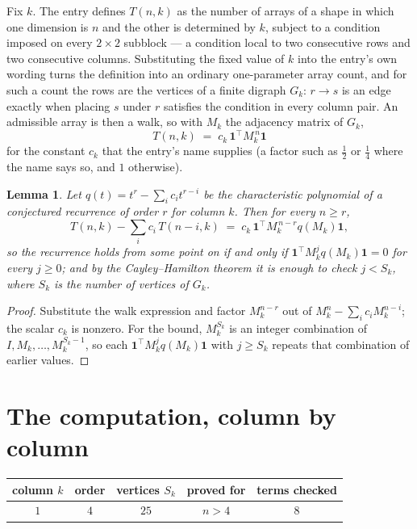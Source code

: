 \documentclass[11pt,a4paper]{article}
\theoremstyle{plain}
\newtheorem{lemma}[theorem]{Lemma}
\theoremstyle{definition}
\begin{document}
Fix $k$. The entry defines $T(n,k)$ as the number of arrays of a shape in which one dimension
is $n$ and the other is determined by $k$, subject to a condition imposed on every
$2\times2$ subblock --- a condition local to two consecutive rows and two consecutive columns.
Substituting the fixed value of $k$ into the entry's own wording turns the definition into an
ordinary one-parameter array count, and for such a count the rows are the vertices of a finite
digraph $G_k$: $r\to s$ is an edge exactly when placing $s$ under $r$ satisfies the condition
in every column pair. An admissible array is then a walk, so with $M_k$ the adjacency matrix
of $G_k$,
\[
T(n,k)\;=\;c_k\,\mathbf{1}^{\!\top}M_k^{\,n}\mathbf{1}
\]
for the constant $c_k$ that the entry's name supplies (a factor such as $\tfrac12$ or
$\tfrac14$ where the name says so, and $1$ otherwise).

\begin{lemma}\label{lem:crit}
Let $q(t)=t^{r}-\sum_i c_it^{r-i}$ be the characteristic polynomial of a conjectured
recurrence of order $r$ for column $k$. Then for every $n\ge r$,
\[
T(n,k)-\sum_i c_i\,T(n-i,k)\;=\;c_k\,\mathbf{1}^{\!\top}M_k^{\,n-r}q(M_k)\mathbf{1},
\]
so the recurrence holds from some point on if and only if
$\mathbf{1}^{\!\top}M_k^{j}q(M_k)\mathbf{1}=0$ for every $j\ge0$; and by the
Cayley--Hamilton theorem it is enough to check $j<S_k$, where $S_k$ is the number of vertices
of $G_k$.
\end{lemma}

\begin{proof}
Substitute the walk expression and factor $M_k^{n-r}$ out of $M_k^{n}-\sum_ic_iM_k^{n-i}$;
the scalar $c_k$ is nonzero. For the bound, $M_k^{S_k}$ is an integer combination of
$I,M_k,\dots,M_k^{S_k-1}$, so each $\mathbf{1}^{\!\top}M_k^{j}q(M_k)\mathbf{1}$ with
$j\ge S_k$ repeats that combination of earlier values.
\end{proof}

\section{The computation, column by column}

\begin{center}
\begin{tabular}{ccccc}
column $k$ & order & vertices $S_k$ & proved for & terms checked \\ \hline
$1$ & $4$ & $25$ & $n>4$ & $8$ \\
\end{tabular}
\end{center}
\end{document}
